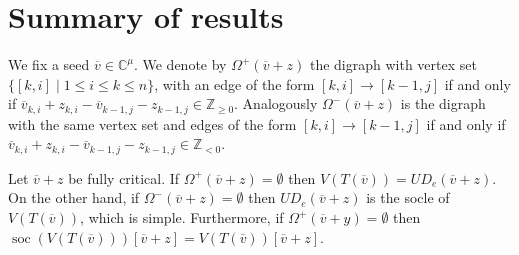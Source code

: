 \documentclass[11pt,fleqn]{amsart}
\newcommand\CC{\mathbb C}
\newcommand\ZZ{\mathbb Z}
\renewcommand\to{\rightarrow}
\newcommand\vv{\overline{v}}
\begin{document}
\begin{bibdiv}
\begin{biblist}
\end{biblist}
\end{bibdiv}

\newpage
\section*{Summary of results}

We fix a seed $\vv \in \CC^\mu$. We denote by $\Omega^+(\vv + z)$ the digraph 
with vertex set $\{[k,i] \mid 1 \leq i \leq k \leq n\}$, with an edge of 
the form $[k,i] \to [k-1,j]$ if and only if $\vv_{k,i} + z_{k,i} - \vv_{k-1,j} 
- z_{k-1,j} \in \ZZ_{\geq 0}$. Analogously $\Omega^-(\vv + z)$ is the digraph 
with the same vertex set and edges of the form $[k,i] \to [k-1,j]$ if and only 
if $\vv_{k,i} + z_{k,i} - \vv_{k-1,j} - z_{k-1,j} \in \ZZ_{< 0}$.

\begin{Proposition*}
Let $\vv + z$ be fully critical.
If $\Omega^+(\vv + z) = \emptyset$ then $V(T(\vv)) = U D_e(\vv + z)$. On the 
other hand, if  $\Omega^-(\vv + z) = \emptyset$ then $U D_e(\vv + z)$ is the 
socle of $V(T(\vv))$, which is simple. Furthermore, if $\Omega^+(\vv + y) = 
\emptyset$ then $\operatorname{soc} (V(T(\vv))) [\vv + z]= V(T(\vv))[\vv + z]$.
\end{Proposition*}
\end{document}
